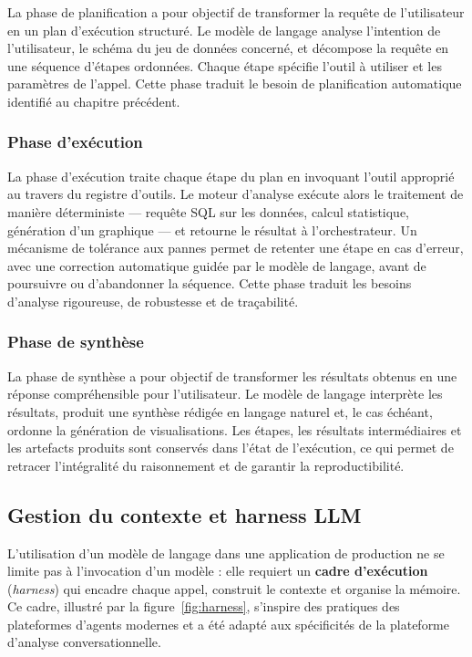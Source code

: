 La phase de planification a pour objectif de transformer la requête de l'utilisateur en un plan d'exécution structuré. Le modèle de langage analyse l'intention de l'utilisateur, le schéma du jeu de données concerné, et décompose la requête en une séquence d'étapes ordonnées. Chaque étape spécifie l'outil à utiliser et les paramètres de l'appel. Cette phase traduit le besoin de planification automatique identifié au chapitre précédent.

\subsubsection{Phase d'exécution}

La phase d'exécution traite chaque étape du plan en invoquant l'outil approprié au travers du registre d'outils. Le moteur d'analyse exécute alors le traitement de manière déterministe — requête SQL sur les données, calcul statistique, génération d'un graphique — et retourne le résultat à l'orchestrateur. Un mécanisme de tolérance aux pannes permet de retenter une étape en cas d'erreur, avec une correction automatique guidée par le modèle de langage, avant de poursuivre ou d'abandonner la séquence. Cette phase traduit les besoins d'analyse rigoureuse, de robustesse et de traçabilité.

\subsubsection{Phase de synthèse}

La phase de synthèse a pour objectif de transformer les résultats obtenus en une réponse compréhensible pour l'utilisateur. Le modèle de langage interprète les résultats, produit une synthèse rédigée en langage naturel et, le cas échéant, ordonne la génération de visualisations. Les étapes, les résultats intermédiaires et les artefacts produits sont conservés dans l'état de l'exécution, ce qui permet de retracer l'intégralité du raisonnement et de garantir la reproductibilité.

\subsection{Gestion du contexte et harness LLM}

L'utilisation d'un modèle de langage dans une application de production ne se limite pas à l'invocation d'un modèle : elle requiert un \textbf{cadre d'exécution} (\textit{harness}) qui encadre chaque appel, construit le contexte et organise la mémoire. Ce cadre, illustré par la figure~\ref{fig:harness}, s'inspire des pratiques des plateformes d'agents modernes et a été adapté aux spécificités de la plateforme d'analyse conversationnelle.

